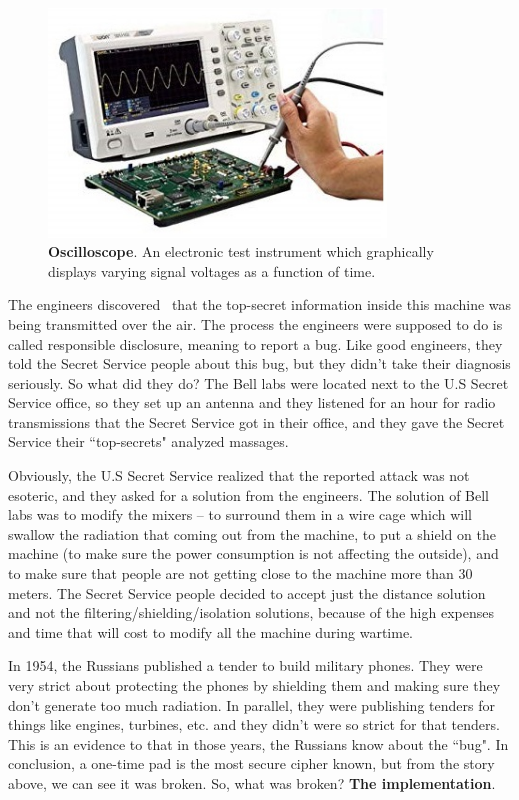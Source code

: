 \begin{figure}
    \centering
    \includegraphics[width=0.8\textwidth]{images/ch1_Intro/oscilloscope.jpg}
    \caption{\textbf{Oscilloscope}. An electronic test instrument which graphically displays varying signal voltages as a function of time.}
    \label{fig:Oscillo}
\end{figure}

The engineers discovered~\cite{NSAsecret} that the top-secret information inside
this machine was being transmitted over the air. The process the engineers were
supposed to do is called responsible disclosure, meaning to report a bug. Like
good engineers, they told the Secret Service people about this bug, but they
didn't take their diagnosis seriously. So what did they do? The Bell labs were
located next to the U.S Secret Service office, so they set up an antenna and
they listened for an hour for radio transmissions that the Secret Service got in
their office, and they gave the Secret Service their ``top-secrets" analyzed
massages.

Obviously, the U.S Secret Service realized that the reported attack was not
esoteric, and they asked for a solution from the engineers. The solution of Bell
labs was to modify the mixers – to surround them in a wire cage which will
swallow the radiation that coming out from the machine, to put a shield on the
machine (to make sure the power consumption is not affecting the outside), and
to make sure that people are not getting close to the machine more than 30
meters. The Secret Service people decided to accept just the distance solution
and not the filtering/shielding/isolation solutions, because of the high
expenses and time that will cost to modify all the machine during wartime.

In 1954, the Russians published a tender to build military phones. They were
very strict about protecting the phones by shielding them and making sure they
don't generate too much radiation. In parallel, they were publishing tenders for
things like engines, turbines, etc. and they didn't were so strict for that
tenders. This is an evidence to that in those years, the Russians know about the
``bug". In conclusion, a one-time pad is the most secure cipher known, but from
the story above, we can see it was broken. So, what was broken? \textbf{The
implementation}.

